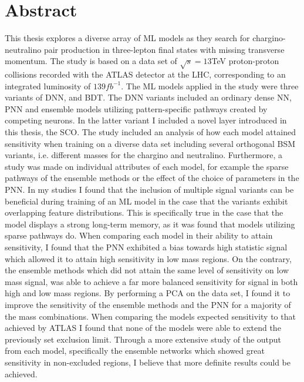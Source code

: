 \chapter*{Abstract} 
This thesis explores a diverse array of \acf{ML} models as they search for chargino-neutralino pair production in 
three-lepton final states with missing transverse momentum. The study is based on a data set of $\sqrt{s} = 13$TeV proton-proton
collisions recorded with the \acs{ATLAS} detector at the \acs{LHC}, corresponding to an integrated luminosity of $139 fb^{-1}$. The \acs{ML} 
models applied in the study were three variants of \acf{DNN}, and \acf{BDT}. The \acs{DNN} variants included an ordinary 
dense \acf{NN}, \acf{PNN} and ensemble models utilizing pattern-specific pathways created by competing neurons. In the latter variant I 
included a novel layer introduced in this thesis, the \acf{SCO}. The study included an analysis of how each model attained sensitivity 
when training on a diverse data set including several orthogonal \acf{BSM} variants, i.e. different masses for the chargino and neutralino. 
Furthermore, a study was made on individual attributes of each model, for example the sparse pathways of the ensemble methods or the effect 
of the choice of parameters in the \acs{PNN}. In my studies I found that the inclusion of multiple signal variants can be beneficial during 
training of an \ac{ML} model in the case that the variants exhibit overlapping feature distributions. This is specifically true in 
the case that the model displays a strong long-term memory, as it was found that models utilizing sparse pathways do. When comparing each 
model in their ability to attain sensitivity, I found that the \acs{PNN} exhibited a bias towards high statistic signal which allowed it 
to attain high sensitivity in low mass regions. On the contrary, the ensemble methods which did not attain the same level of sensitivity 
on low mass signal, was able to achieve a far more balanced sensitivity for signal in both high and low mass regions. By performing 
a \acf{PCA} on the data set, I found it to improve the sensitivity of the ensemble methods and the \ac{PNN} for a majority of the mass combinations.
When comparing the models expected sensitivity to that achieved by \acs{ATLAS} I found that none of the models were able to extend the previously set exclusion limit.
Through a more extensive study of the output from each model, specifically the ensemble networks which showed great sensitivity in non-excluded 
regions, I believe that more definite results could be achieved. 

